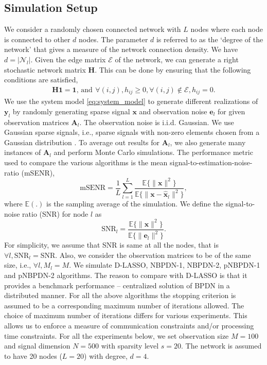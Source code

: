 \documentclass[journal]{IEEEtran}
\newcommand{\mbx}{\mathbf{x}}
\newcommand{\mbA}{\mathbf{A}}
\newcommand{\mbH}{\mathbf{H}}
\newcommand{\mby}{\mathbf{y}}
\newcommand{\mbe}{\mathbf{e}}
\begin{document}
\subsection{Simulation Setup}
We consider a randomly chosen connected network with $L$ nodes where each node is connected to other $d$ nodes. The parameter $d$ is referred to as the `degree of the network' that gives a measure of the network connection density. We have $d = |\mathcal{N}_l|$. Given the edge matrix $\mathcal{E}$ of the network, we can generate a right stochastic network matrix $\mbH$. This can be done by ensuring that the following conditions are satisfied,
\begin{eqnarray*}
\mbH \mathbf{1} = \mathbf{1}, \, \text{and} \,\ \forall(i,j), h_{ij} \geq 0, \forall(i,j) \notin \mathcal{E}, h_{ij} = 0.
\end{eqnarray*}
We use the system model \eqref{eq:system_model} to generate different realizations of $\mby_l$ by randomly generating  sparse signal $\mbx$ and observation noise $\mbe_l$ for given observation matrices $\mbA_l$. The observation noise is i.i.d. Gaussian. We use Gaussian sparse signals, i.e., sparse signals with non-zero elements chosen from a Gaussian distribution \cite{Chatterjee_Sundman_Vehkapera_Skoglund_TSP_2012}. To average out results for $\mbA_l$, we also generate many instances of $\mbA_l$ and perform Monte Carlo simulations. The performance metric used to compare the various algorithms is the mean signal-to-estimation-noise-ratio (mSENR),
\begin{equation*}
\text{mSENR} = \frac{1}{L} \sum\limits_{l=1}^{L} \frac{\mathbb{E}\{\|\mbx\|^{2}\}}{\mathbb{E}\{\|\mbx -\hat{\mbx}_l\|^{2}\}},
\end{equation*}
where $\mathbb{E}(.)$ is the sampling average of the simulation. We define the signal-to-noise ratio (SNR) for node $l$ as
\begin{equation*}
\text{SNR}_l =  \frac{\mathbb{E}\{\|\mbx\|^{2}\}}{\mathbb{E}\{\|\mbe_l\|^{2}\}}.
\end{equation*}
For simplicity, we assume that SNR is same at all the nodes, that is $\forall l, \text{SNR}_l = \text{SNR}$. Also, we consider the observation matrices to be of the same size, i.e., $\forall l, M_l = M$. We simulate D-LASSO, NBPDN-1, NBPDN-2, pNBPDN-1 and pNBPDN-2 algorithms. The reason to compare with D-LASSO is that it provides a benchmark performance -- centralized solution of BPDN in a distributed manner. For all the above algorithms the stopping criterion is assumed to be a corresponding maximum number of iterations allowed. The choice of maximum number of iterations differs for various experiments. This allows us to enforce a measure of communication constraints and/or processing time constraints. For all the experiments below, we set observation size $M = 100$ and signal dimension $N = 500$ with sparsity level $s = 20$. The network is assumed to have 20 nodes ($L =20$) with degree, $d = 4$. 
\end{document}
